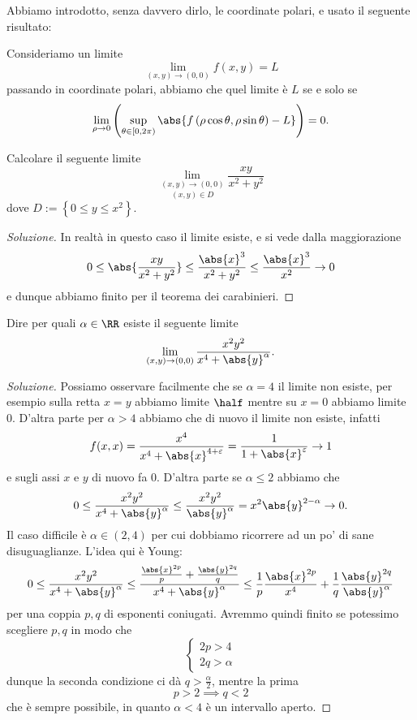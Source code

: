 \documentclass[11pt]{scrartcl}
\begin{document}
	Abbiamo introdotto, senza davvero dirlo, le coordinate polari, e usato il seguente risultato:
	\begin{proposition}
		Consideriamo un limite
		$$\lim_{(x,y)\to (0,0)}f(x,y)=L$$
		passando in coordinate polari, abbiamo che quel limite è $L$ se e solo se
		$$\lim_{\rho \to 0}\left(\sup_{\theta\in [0,2\pi)}\abs{f\left(\rho \cos\theta,\rho \sin \theta\right)-L}\right)=0.$$
	\end{proposition}
	\begin{exercise}
		Calcolare il seguente limite
		$$\underset{(x,y)\in D}{\lim_{(x,y)\to (0,0)}}\frac{xy}{x^2+y^2}$$
		dove $D:=\left\{0\le y \le x^2\right\}$.
	\end{exercise}
	\begin{proof}[Soluzione]
		In realtà in questo caso il limite esiste, e si vede dalla maggiorazione
		$$0\le \abs{\frac{xy}{x^2+y^2}}\le \frac{\abs{x}^3}{x^2+y^2}\le \frac{\abs{x}^3}{x^2}\to 0$$
		e dunque abbiamo finito per il teorema dei carabinieri.
	\end{proof}
	\begin{exercise}
		Dire per quali $\alpha\in\RR$ esiste il seguente limite
		$$\lim_{(x,y)\to (0,0)}\frac{x^2y^2}{x^4+\abs{y}^\alpha}.$$
	\end{exercise}
	\begin{proof}[Soluzione]
		Possiamo osservare facilmente che se $\alpha=4$ il limite non esiste, per esempio sulla retta $x=y$ abbiamo limite $\half$ mentre su $x=0$ abbiamo limite $0$. D'altra parte per $\alpha>4$ abbiamo che di nuovo il limite non esiste, infatti 
		$$f(x,x)=\frac{x^4}{x^4+\abs{x}^{4+\varepsilon}}=\frac{1}{1+\abs{x}^\varepsilon}\to 1$$
		e sugli assi $x$ e $y$ di nuovo fa $0$. D'altra parte se $\alpha\le 2$ abbiamo che
		$$0\le \frac{x^2y^2}{x^4+\abs{y}^\alpha}\le \frac{x^2y^2}{\abs{y}^\alpha}=x^2\abs{y}^{2-\alpha}\to 0.$$
		Il caso difficile è $\alpha\in (2,4)$ per cui dobbiamo ricorrere ad un po' di sane disuguaglianze. L'idea qui è Young:
		$$0\le \frac{x^2y^2}{x^4+\abs{y}^\alpha}\le \frac{\frac{\abs{x}^{2p}}{p}+\frac{\abs{y}^{2q}}{q}}{x^4+\abs{y}^\alpha}\le \frac{1}{p}\frac{\abs{x}^{2p}}{x^4}+\frac{1}{q}\frac{\abs{y}^{2q}}{\abs{y}^\alpha}$$
		per una coppia $p,q$ di esponenti coniugati. Avremmo quindi finito se potessimo scegliere $p,q$ in modo che
		$$
		\begin{cases}
			2p > 4 \\
			2q > \alpha
		\end{cases}
		$$
		dunque la seconda condizione ci dà $q>\frac{\alpha}{2}$, mentre la prima
		$$p>2 \implies q<2$$
		che è sempre possibile, in quanto $\alpha<4$ è un intervallo aperto. 
	\end{proof}
\end{document}
